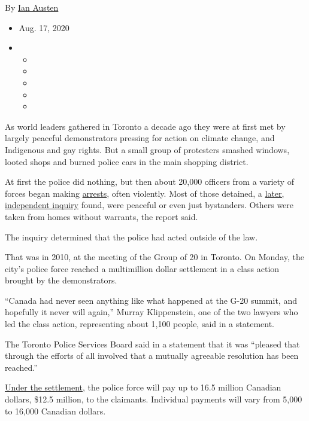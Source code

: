 By \href{https://www.nytimes3xbfgragh.onion/by/ian-austen}{Ian Austen}

\begin{itemize}
\item
  Aug. 17, 2020
\item
  \begin{itemize}
  \item
  \item
  \item
  \item
  \item
  \end{itemize}
\end{itemize}

As world leaders gathered in Toronto a decade ago they were at first met
by largely peaceful demonstrators pressing for action on climate change,
and Indigenous and gay rights. But a small group of protesters smashed
windows, looted shops and burned police cars in the main shopping
district​.

At first the police did nothing, but then about 20,000 officers from a
variety of forces began making
\href{https://www.nytimes3xbfgragh.onion/2010/06/28/world/americas/28security.html}{arrests},
often violently. Most of those detained, a
\href{https://www.nytimes3xbfgragh.onion/2012/05/17/world/americas/canadian-police-violated-laws-in-g-20-sweep-inquiry-finds.html}{later,
independent inquiry} found, were peaceful or even just bystanders.
Others were taken from homes without warrants, the report said.

The inquiry determined that the police had acted outside of the law.

That was in 2010, at the meeting of the Group of 20 in Toronto. On
Monday, the city's police force reached a multimillion dollar settlement
in a class action brought by the demonstrators.

``Canada had never seen anything like what happened at the G-20 summit,
and hopefully it never will again,'' Murray Klippenstein, one of the two
lawyers who led the class action, representing about 1,100 people, said
in a statement.

The Toronto Police Services Board said in a statement that it was
``pleased that through the efforts of all involved that a mutually
agreeable resolution has been reached.''

\href{http://www.g20classaction.ca/wp-content/uploads/2020/08/G20-Settlement-Agreement-July-3-2020.pdf}{Under
the settlement,} the police force will pay up to 16.5 million Canadian
dollars, \$12.5 million, to the claimants. Individual payments will vary
from 5,000 to 16,000 Canadian dollars.

